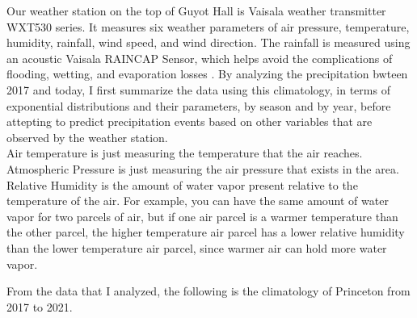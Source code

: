 \documentclass[11pt]{report}
\begin{document}
% 

Our weather station on the top of Guyot Hall is Vaisala weather transmitter
WXT530 series. It measures six weather parameters of air pressure,
temperature, humidity, rainfall, wind speed, and wind direction. The
rainfall is measured using an acoustic Vaisala RAINCAP Sensor, which helps
avoid the complications of flooding, wetting, and evaporation losses
\cite[]{Vaisala}. By analyzing the precipitation bwteen 2017 and today, I
first summarize the data using this climatology, in terms of exponential
distributions and their parameters, by season and by year, before attepting
to predict precipitation events based on other variables that are observed
by the weather station.
\\
Air temperature is just measuring the temperature that the air reaches. Atmospheric Pressure is just measuring the air pressure that exists in the area. Relative Humidity is the amount of water vapor present relative to the temperature of the air. For example, you can have the same amount of water vapor for two parcels of air, but if one air parcel is a warmer temperature than the other parcel, the higher temperature air parcel has a lower relative humidity than the lower temperature air parcel, since warmer air can hold more water vapor. 

From the data that I analyzed, the following is the climatology of Princeton from 2017 to 2021. 
\end{document}
